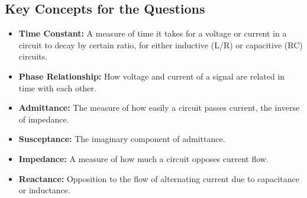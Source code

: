 \subsection*{Key Concepts for the Questions}
\begin{itemize}
    \item \textbf{Time Constant:}  A measure of time it takes for a voltage or current in a circuit to decay by certain ratio, for either inductive (L/R) or capacitive (RC) circuits.
    \item \textbf{Phase Relationship:} How voltage and current of a signal are related in time with each other.
        \item \textbf{Admittance:}  The measure of how easily a circuit passes current, the inverse of impedance.
        \item  \textbf{Susceptance:} The imaginary component of admittance.
    \item \textbf{Impedance:} A measure of how much a circuit opposes current flow.
    \item \textbf{Reactance:} Opposition to the flow of alternating current due to capacitance or inductance.
     
\end{itemize}

